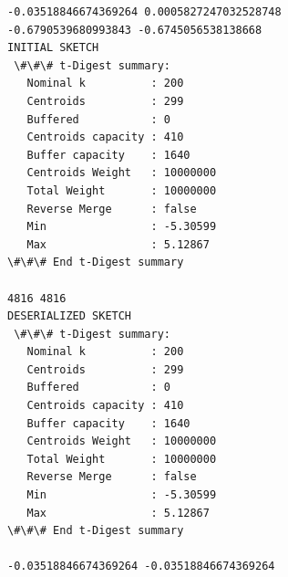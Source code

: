 \documentclass[11pt]{article}
\begin{document}
    \begin{Verbatim}[commandchars=\\\{\}]
-0.03518846674369264 0.0005827247032528748
-0.6790539680993843 -0.6745056538138668
INITIAL SKETCH
 \#\#\# t-Digest summary:
   Nominal k          : 200
   Centroids          : 299
   Buffered           : 0
   Centroids capacity : 410
   Buffer capacity    : 1640
   Centroids Weight   : 10000000
   Total Weight       : 10000000
   Reverse Merge      : false
   Min                : -5.30599
   Max                : 5.12867
\#\#\# End t-Digest summary

4816 4816
DESERIALIZED SKETCH
 \#\#\# t-Digest summary:
   Nominal k          : 200
   Centroids          : 299
   Buffered           : 0
   Centroids capacity : 410
   Buffer capacity    : 1640
   Centroids Weight   : 10000000
   Total Weight       : 10000000
   Reverse Merge      : false
   Min                : -5.30599
   Max                : 5.12867
\#\#\# End t-Digest summary

-0.03518846674369264 -0.03518846674369264
    \end{Verbatim}


    
    
    
\end{document}
